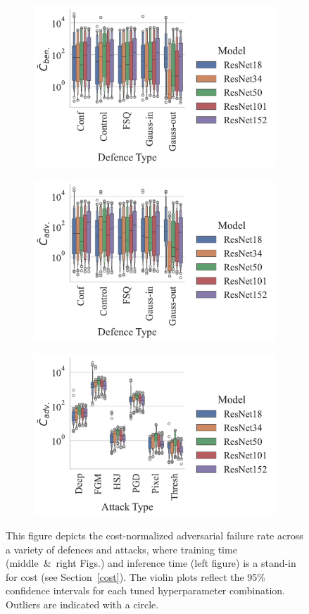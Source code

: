 \begin{figure}[!h]
    \centering
    \begin{subfigure}
        \centering
        \includegraphics[width=.45\textwidth]{plots/ben_failures_per_train_time_vs_defence_type.pdf}
    \end{subfigure}
    \begin{subfigure}
        \centering
        \includegraphics[width=.45\textwidth]{plots/adv_failures_per_train_time_vs_defence_type.pdf}
    \end{subfigure}
    \begin{subfigure}
        \centering
        \includegraphics[width=.45\textwidth]{plots/adv_failures_per_train_time_vs_attack_type.pdf}
    \end{subfigure}
    \caption{This figure depicts the cost-normalized adversarial failure rate across a variety of defences and attacks, where training time (middle~\&~right Figs.) and inference time (left figure) is a stand-in for cost (see Section~\ref{cost}). The violin plots reflect the 95\% confidence intervals for each tuned hyperparameter combination. Outliers are indicated with a circle.}
    \label{fig:failures_per_train_time}
\end{figure}

